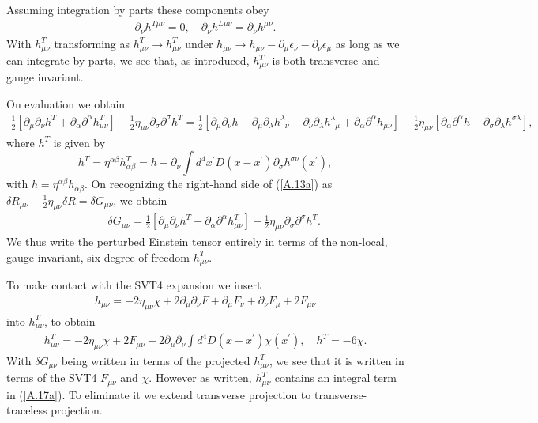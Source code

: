 \documentclass[aps,onecolumn,10pt]{revtex4}
\numberwithin{equation}{section}
\numberwithin{equation}{section}
\begin{document}
%
Assuming integration by parts these components obey
%
\begin{eqnarray}
\partial_{\nu}h^{T\mu\nu}
=0,\quad 
\partial_{\nu}h^{L\mu\nu}=\partial_{\nu}h^{\mu\nu}.
\label{A.12a}
\end{eqnarray}
% 
With $h^{T}_{\mu\nu}$ transforming as $h^{T}_{\mu\nu}\rightarrow h^{T}_{\mu\nu}$ under $h_{\mu\nu}\rightarrow h_{\mu\nu}-\partial_{\mu}\epsilon_{\nu}-\partial_{\nu}\epsilon_{\mu}$ as long as we can integrate by parts, we see that, as introduced, $h^{T}_{\mu\nu}$ is both transverse and gauge invariant. 

On evaluation we obtain 
%
\begin{align}
\frac{1}{2}[\partial_{\mu}\partial_{\nu}h^{T}
+\partial_{\alpha}\partial^{\alpha}h_{\mu\nu}^{T}]
-\frac{1}{2}\eta_{\mu\nu}\partial_{\sigma}\partial^{\sigma}
h^{T}
=\frac{1}{2}[\partial_{\mu}\partial_{\nu}h
-\partial_{\mu}\partial_{\lambda}h^{\lambda}_{\phantom{\lambda}\nu}
-\partial_{\nu}\partial_{\lambda}h^{\lambda}_{\phantom{\lambda}\mu}
+\partial_{\alpha}\partial^{\alpha}h_{\mu\nu}]
-\frac{1}{2}\eta_{\mu\nu}[\partial_{\alpha}\partial^{\alpha}h
-\partial_{\sigma}\partial_{\lambda}h^{\sigma\lambda}],
\label{A.13a}
\end{align}
%
where $h^{T}$ is given by
%
\begin{equation}
h^{T}=\eta^{\alpha\beta}h_{\alpha\beta}^{T}
=h -\partial_{\nu}\int
d^4x^{\prime}D(x-x^{\prime})\partial_{\sigma}
h^{\sigma\nu}(x^{\prime}),
\label{A.14a}
\end{equation}
%
with $h=\eta^{\alpha\beta}h_{\alpha\beta}$. On recognizing the right-hand side of  (\ref{A.13a}) as $\delta R_{\mu\nu}-\frac{1}{2}\eta_{\mu\nu}\delta R=\delta G_{\mu\nu}$,
we obtain 
%
\begin{eqnarray}
&&\delta G_{\mu\nu}=\tfrac{1}{2}[\partial_{\mu}\partial_{\nu}h^{T}
+\partial_{\alpha}\partial^{\alpha}h_{\mu\nu}^{T}]
-\frac{1}{2}\eta_{\mu\nu}\partial_{\sigma}\partial^{\sigma}
h^{T}.
\label{A.15a}
\end{eqnarray}
%
We thus write the perturbed Einstein tensor entirely in terms of the non-local, gauge invariant, six degree of freedom $h_{\mu\nu}^T$.

To make contact with the SVT4 expansion we insert
%
\begin{eqnarray}
h_{\mu\nu}=-2\eta_{\mu\nu}\chi+2\partial_{\mu}\partial_{\nu}F
+ \partial_{\mu}F_{\nu}+\partial_{\nu}F_{\mu}+2F_{\mu\nu}
\label{A.16a}
\end{eqnarray}
%
into $h_{\mu\nu}^T$,  to obtain
%
\begin{eqnarray}
h^T_{\mu\nu}=-2\eta_{\mu\nu}\chi+2F_{\mu\nu}+2\partial_{\mu}\partial_{\nu}\int d^4D(x-x^{\prime})\chi(x^{\prime}),\quad h^T=-6\chi.
\label{A.17a}
\end{eqnarray}
%
With $\delta G_{\mu\nu}$ being written in terms of the projected $h^T_{\mu\nu}$, we see that it is written in terms of the SVT4 $F_{\mu\nu}$ and $\chi$. However as written, $h_{\mu\nu}^T$ contains an integral term in (\ref{A.17a}). To eliminate it we extend transverse projection to transverse-traceless projection.
\end{document}
